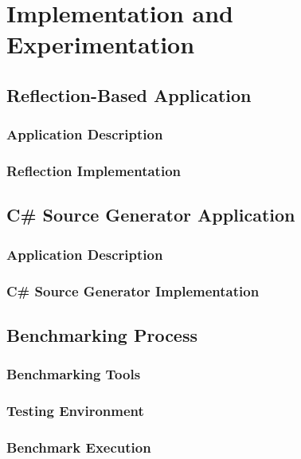 \chapter{Implementation and Experimentation}
\section{Reflection-Based Application}
\subsection{Application Description}
\subsection{Reflection Implementation}
\section{C\# Source Generator Application}
\subsection{Application Description}
\subsection{C\# Source Generator Implementation}
\section{Benchmarking Process}
\subsection{Benchmarking Tools}
\subsection{Testing Environment}
\subsection{Benchmark Execution}